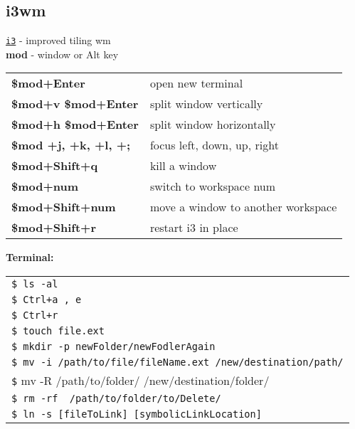 \documentclass[10pt,landscape]{article}
\begin{document}
\begin{multicols}{3}
\section*{i3wm}
\vspace{-0.7em}
\texttt{\href{https://i3wm.org/docs/userguide.html}{i3}} - improved tiling wm \\
\textbf{mod} - window or Alt key\\
\begin{tabular}{l l}
\textbf{\$mod+Enter} & open new terminal \\
\textbf{\$mod+v \$mod+Enter} & split window vertically \\
\textbf{\$mod+h \$mod+Enter} & split window horizontally \\
\textbf{\$mod +j, +k, +l, +;} & focus left, down, up, right \\
\textbf{\$mod+Shift+q} & kill a window \\
\textbf{\$mod+num} & switch to workspace num \\
\textbf{\$mod+Shift+num} & move a window to another workspace \\
\textbf{\$mod+Shift+r} &  restart i3 in place \\
\end{tabular}

\vfill
\columnbreak
\textbf{Terminal:}\\
\begin{tabular}{l}
\hspace{1ex} \texttt{\$ ls -al} \\
\hspace{1ex} \texttt{\$ Ctrl+a , e}  \\
\hspace{1ex} \texttt{\$ Ctrl+r} \\
\hspace{1ex} \texttt{\$ touch file.ext} \\
\hspace{1ex} \texttt{\$ mkdir -p newFolder/newFodlerAgain} \\
\hspace{1ex} \texttt{\$ mv -i /path/to/file/fileName.ext /new/destination/path/} \\
\hspace{1ex} \texttt\$ {mv -R /path/to/folder/ /new/destination/folder/}  \\
\hspace{1ex} \texttt{\$ rm -rf ~/path/to/folder/to/Delete/} \\
\hspace{1ex} \texttt{\$ ln -s [fileToLink] [symbolicLinkLocation]} \\
\end{tabular}


\end{multicols}
\end{document}
